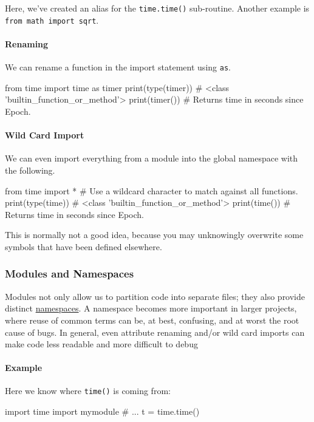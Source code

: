 \documentclass[12pt,letterpaper,twoside]{article}
\begin{document}
Here, we've created an alias for the \texttt{time.time()} sub-routine. 
Another example is \texttt{from\ math\ import\ sqrt}.

\paragraph{Renaming}
We can rename a function in the import statement using \texttt{as}.

\begin{python}
from time import time as timer
print(type(timer))   # <class 'builtin_function_or_method'>
print(timer())       # Returns time in seconds since Epoch.
\end{python}

\paragraph{Wild Card Import}
We can even import everything from a module into the global namespace with the following.

\begin{python}
from time import *    # Use a wildcard character to match against all functions.
print(type(time))     # <class 'builtin_function_or_method'>
print(time())         # Returns time in seconds since Epoch.
\end{python}

This is normally not a good idea, because you may unknowingly overwrite
some symbols that have been defined elsewhere.

\subsubsection{Modules and Namespaces}
Modules not only allow us to partition code into separate files; they also provide
distinct \href{https://en.wikipedia.org/wiki/Namespace}{namespaces}. A namespace
becomes more important in larger projects, where reuse of common terms can be, at best,
confusing, and at worst the root cause of bugs.
In general, even attribute renaming and/or wild card imports can make code less
readable and more difficult to debug

\paragraph{Example}
Here we know where \texttt{time()} is coming from:

\begin{python}
import time
import mymodule
# ...
t = time.time()
\end{python}
\end{document}
